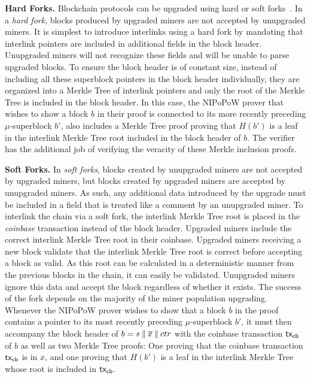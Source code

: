\noindent
\textbf{Hard Forks.}
Blockchain protocols can be upgraded using hard or soft
forks~\cite{buterinforks}. In a \emph{hard fork}, blocks produced by
upgraded miners are not accepted by unupgraded miners. It is simplest to
introduce interlinks using a hard fork by mandating that interlink pointers are
included in additional fields in the block header. Unupgraded miners will not
recognize these fields and will be unable to parse upgraded blocks.
To ensure the block header is of constant size, instead of including all these
superblock pointers in the block header individually, they are organized into a
Merkle Tree of interlink pointers and only the root of the Merkle Tree is
included in the block header. In this case, the NIPoPoW prover that wishes to
show a block $b$ in their proof is connected to its more recently preceding
$\mu$-superblock $b'$, also includes a Merkle Tree proof proving that $H(b')$ is
a leaf in the interlink Merkle Tree root included in the block header of $b$.
The verifier has the additional job of verifying the veracity of these Merkle
inclusion proofs.

\noindent
\textbf{Soft Forks.}
In \emph{soft forks}, blocks created by unupgraded miners are not accepted by
upgraded miners, but blocks created by upgraded miners are accepted by
unupgraded miners. As such, any additional data introduced by the upgrade must
be included in a field that is treated like a comment by an unupgraded miner.
To interlink the chain via a soft fork, the interlink Merkle Tree root is
placed in the \emph{coinbase} transaction instead of the block header. Upgraded
miners include the correct interlink Merkle Tree root in their coinbase.
Upgraded miners receiving a new block validate that the interlink Merkle Tree
root is correct before accepting a block as valid. As this root can be
calculated in a deterministic manner from the previous blocks in the chain, it
can easily be validated. Unupgraded miners ignore this data and accept the block
regardless of whether it exists. The success of the fork depends on the majority
of the miner population upgrading. Whenever the NIPoPoW prover wishes to show that a
block $b$ in the proof contains a pointer to its most recently preceding
$\mu$-superblock $b'$, it must then accompany the block header of $b = s \mathbin{\|}
\overline{x} \mathbin{\|} ctr$ with the coinbase transaction $\mathsf{tx}_{\mathsf{cb}}$ of $b$ as well
as two Merkle Tree proofs: One proving that the coinbase transaction $\mathsf{tx}_{\mathsf{cb}}$
is in $\overline{x}$, and one proving that $H(b')$ is a leaf in the interlink
Merkle Tree whose root is included in $\mathsf{tx}_{\mathsf{cb}}$.
